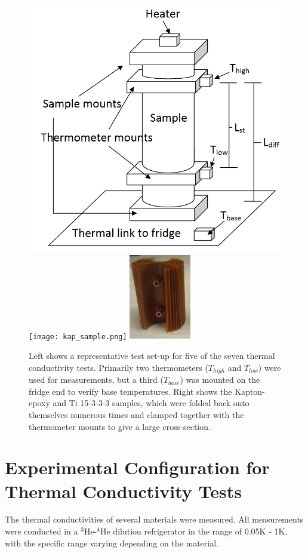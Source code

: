 \documentclass[final]{svjour2}
\begin{document}
\begin{figure}[h]
\centering
\includegraphics[width = .4\textwidth]{Rep_test_sample.png}
\qquad
\texttt{[image: kap\_sample.png]}
\includegraphics[width = 0.24\textwidth]{kap_side.png}

\caption{{\small Left shows a representative test set-up for five of the seven thermal conductivity tests. Primarily two thermometers ($T_{high}$ and $T_{low}$) were used for measurements, but a third ($T_{base}$) was mounted on the fridge end to verify base temperatures. Right shows the Kapton-epoxy and Ti 15-3-3-3 samples, which were folded back onto themselves numerous times and clamped together with the thermometer mounts to give a large cross-section.}}
\label{setup}
\end{figure}

\section{Experimental Configuration for Thermal Conductivity Tests}
The thermal conductivities of several materials were measured. All measurements were conducted in a $^3$He-$^4$He dilution refrigerator in the range of 0.05K - 1K, with the specific range varying depending on the material.
\end{document}
